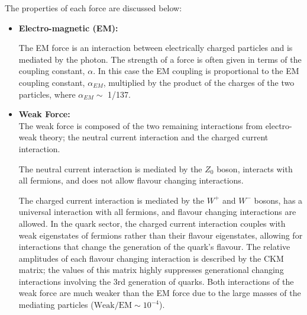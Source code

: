 \noindent
The properties of each force are discussed below:
\begin{itemize}[leftmargin=*]
\item\textbf{Electro-magnetic (EM):}

  The EM force is an interaction between electrically charged particles and is mediated by the photon.
  The strength of a force is often given in terms of the coupling constant, $\alpha$.
  In this case the EM coupling is proportional to the EM coupling constant, $\alpha_{EM}$,
  multiplied by the product of the charges of the two particles, where $\alpha_{EM} \sim$ 1/137.\vspace{1em} %

\item\textbf{Weak Force:} \\
  The weak force is composed of the two remaining interactions from electro-weak theory;
  the neutral current interaction and the charged current interaction.
  
  The neutral current interaction is mediated by the $Z_0$ boson, interacts with all fermions,
  and does not allow flavour changing interactions.

  The charged current interaction is mediated by the $W^+$ and $W^-$ bosons,
  has a universal interaction with all fermions,
  and flavour changing interactions are allowed.
  In the quark sector, the charged current interaction
  couples with weak eigenstates of fermions rather than their flavour eigenstates,
  allowing for interactions that change the generation of the quark's flavour.
  The relative amplitudes of each flavour changing interaction is described by the CKM matrix;
  the values of this matrix highly suppresses generational changing interactions involving the 3rd generation of quarks.
  Both interactions of the weak force are much weaker than the EM force
  due to the large masses of the mediating particles
  ($\text{Weak}/\text{EM} \sim 10^{-4}$).\vspace{1em} %
  

\end{itemize}

